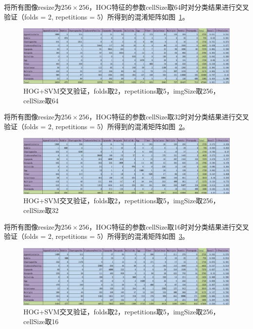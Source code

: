 \documentclass[12pt]{article}
\begin{document}
\begin{enumerate}
将所有图像resize为$256 \times 256$，HOG特征的参数cellSize取64时对分类结果进行交叉验证（folds = 2, repetitions = 5）所得到的混淆矩阵如图~\ref{fig: HOG-SVM-2-folds-5-repetitions-64-256}。
\begin{figure}[!ht]
\centering
\includegraphics[width=1.0\linewidth]{HOG-SVM-2-folds-5-repetitions-64-256}
\caption{HOG+SVM交叉验证，folds取2，repetitions取5，imgSize取256，cellSize取64}
\label{fig: HOG-SVM-2-folds-5-repetitions-64-256}
\end{figure}

将所有图像resize为$256 \times 256$，HOG特征的参数cellSize取32时对分类结果进行交叉验证（folds = 2, repetitions = 5）所得到的混淆矩阵如图~\ref{fig: HOG-SVM-2-folds-5-repetitions-32-256}。
\begin{figure}[!ht]
\centering
\includegraphics[width=1.0\linewidth]{HOG-SVM-2-folds-5-repetitions-32-256}
\caption{HOG+SVM交叉验证，folds取2，repetitions取5，imgSize取256，cellSize取32}
\label{fig: HOG-SVM-2-folds-5-repetitions-32-256}
\end{figure}

将所有图像resize为$256 \times 256$，HOG特征的参数cellSize取16时对分类结果进行交叉验证（folds = 2, repetitions = 5）所得到的混淆矩阵如图~\ref{fig: HOG-SVM-2-folds-5-repetitions-16-256}。
\begin{figure}[!ht]
\centering
\includegraphics[width=1.0\linewidth]{HOG-SVM-2-folds-5-repetitions-16-256}
\caption{HOG+SVM交叉验证，folds取2，repetitions取5，imgSize取256，cellSize取16}
\label{fig: HOG-SVM-2-folds-5-repetitions-16-256}
\end{figure}


\end{enumerate}
\end{document}
